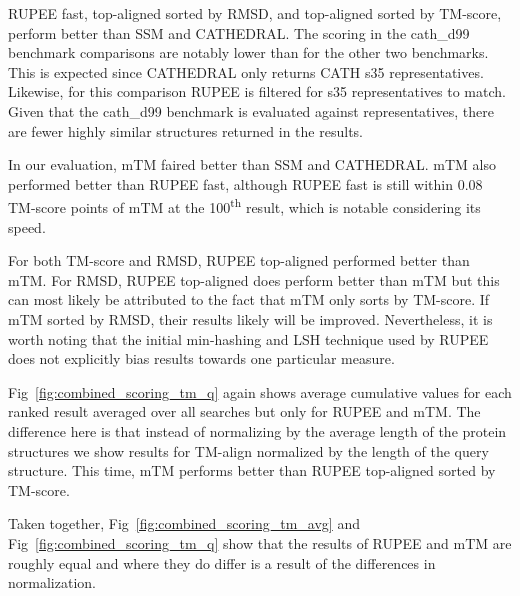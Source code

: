\documentclass[10pt,letterpaper]{article}
\renewcommand{\figurename}{Fig}
\begin{document}
\begin{figure*}[!h]
\caption{Scoring from TM-align pairwise alignments normalized by the average length of aligned structures for RUPEE fast, RUPEE top-aligned sorted by TM-score, and RUPEE top-aligned sorted by RMSD}
\label{fig:combined_scoring_tm_avg}
\end{figure*}

RUPEE fast, top-aligned sorted by RMSD, and top-aligned sorted by TM-score, perform better than SSM and CATHEDRAL.
The scoring in the cath\_d99 benchmark comparisons are notably lower than for the other two benchmarks. 
This is expected since CATHEDRAL only returns CATH s35 representatives.
Likewise, for this comparison RUPEE is filtered for s35 representatives to match. 
Given that the cath\_d99 benchmark is evaluated against representatives, there are fewer highly similar structures returned in the results. 

In our evaluation, mTM faired better than SSM and CATHEDRAL. 
mTM also performed better than RUPEE fast, although RUPEE fast is still within 0.08 TM-score points of mTM at the 100\textsuperscript{th} result, which is notable considering its speed.

For both TM-score and RMSD, RUPEE top-aligned performed better than mTM. 
For RMSD, RUPEE top-aligned does perform better than mTM but this can most likely be attributed to the fact that mTM only sorts by TM-score. 
If mTM sorted by RMSD, their results likely will be improved. 
Nevertheless, it is worth noting that the initial min-hashing and LSH technique used by RUPEE does not explicitly bias results towards one particular measure. 

\figurename~\ref{fig:combined_scoring_tm_q} again shows average cumulative values for each ranked result averaged over all searches but only for RUPEE and mTM. 
The difference here is that instead of normalizing by the average length of the protein structures we show results for TM-align normalized by the length of the query structure. 
This time, mTM  performs better than RUPEE top-aligned sorted by TM-score.  

\begin{figure*}[!h]
\caption{Scoring from TM-align pairwise alignments normalized by the length of the query structure for RUPEE fast, RUPEE top-aligned sorted by TM-score, and RUPEE top-aligned sorted by RMSD}
\label{fig:combined_scoring_tm_q}
\end{figure*}

Taken together, \figurename~\ref{fig:combined_scoring_tm_avg} and \figurename~\ref{fig:combined_scoring_tm_q} show that the results of RUPEE and mTM are roughly equal and where they do differ is a result of the differences in normalization. 
\end{document}
